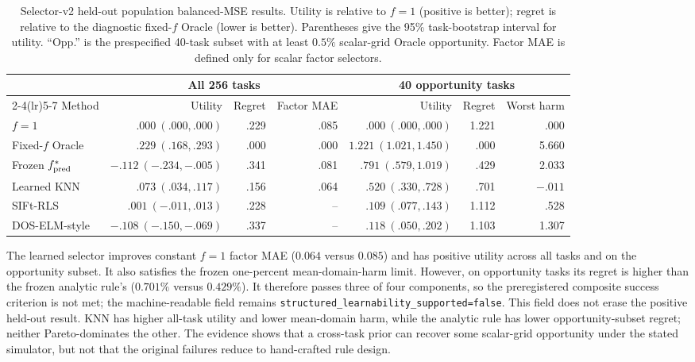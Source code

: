 \documentclass[10pt]{article}
\begin{document}
\begin{table}[h]
  \centering
  \caption{Selector-v2 held-out population balanced-MSE results. Utility is
  relative to $f=1$ (positive is better); regret is relative to the diagnostic
  fixed-$f$ Oracle (lower is better). Parentheses give the 95\% task-bootstrap
  interval for utility. ``Opp.'' is the prespecified 40-task subset with at
  least $0.5\%$ scalar-grid Oracle opportunity. Factor MAE is defined only for scalar
  factor selectors.}
  \label{tab:selector-v2}
  \setlength{\tabcolsep}{4pt}\small
  \begin{tabular}{lrrrrrr}
    \toprule
    & \multicolumn{3}{c}{All 256 tasks} & \multicolumn{3}{c}{40 opportunity tasks} \\
    \cmidrule(lr){2-4}\cmidrule(lr){5-7}
    Method & Utility & Regret & Factor MAE & Utility & Regret & Worst harm \\
    \midrule
    $f=1$ & $.000\ (.000,.000)$ & .229 & .085 & $.000\ (.000,.000)$ & 1.221 & .000 \\
    Fixed-$f$ Oracle & $.229\ (.168,.293)$ & .000 & .000 & $1.221\ (1.021,1.450)$ & .000 & 5.660 \\
    Frozen $f^*_{\rm pred}$ & $-.112\ (-.234,-.005)$ & .341 & .081 & $.791\ (.579,1.019)$ & .429 & 2.033 \\
    Learned KNN & $.073\ (.034,.117)$ & .156 & .064 & $.520\ (.330,.728)$ & .701 & $-.011$ \\
    SIFt-RLS & $.001\ (-.011,.013)$ & .228 & -- & $.109\ (.077,.143)$ & 1.112 & .528 \\
    DOS-ELM-style & $-.108\ (-.150,-.069)$ & .337 & -- & $.118\ (.050,.202)$ & 1.103 & 1.307 \\
    \bottomrule
  \end{tabular}
\end{table}

\FloatBarrier

The learned selector improves constant $f=1$ factor MAE ($0.064$ versus
$0.085$) and has positive utility across all tasks and on the opportunity
subset. It also satisfies the frozen one-percent mean-domain-harm limit.
However, on opportunity tasks its regret is higher than the frozen analytic
rule's ($0.701\%$ versus $0.429\%$). It therefore passes three of four
components, so the preregistered composite success criterion is not met; the
machine-readable field remains
\texttt{structured\_learnability\_supported=false}. This field does not erase
the positive held-out result. KNN has higher all-task utility and lower
mean-domain harm, while the analytic rule has lower opportunity-subset regret;
neither Pareto-dominates the other. The evidence shows that a cross-task prior
can recover some scalar-grid opportunity under the stated simulator, but not
that the original failures reduce to hand-crafted rule design.
\end{document}
